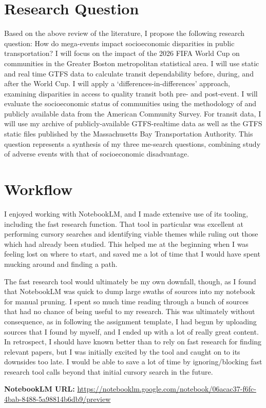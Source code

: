 \documentclass[12pt]{article}
\begin{document}
\section{Research Question}
Based on the above review of the literature, I propose the following research question:
How do mega-events impact socioeconomic disparities in public transportation?
I will focus on the impact of the 2026 FIFA World Cup on communities in the Greater Boston metropolitan statistical area.
I will use static and real time GTFS data to calculate transit dependability before, during, and after the World Cup.
I will apply a `differences-in-differences' approach, examining disparities in access to quality transit both pre- and post-event.
I will evaluate the socioeconomic status of communities using the methodology of \citet{allenSizingTransportPoverty2019} and publicly available data from the American Community Survey.
For transit data, I will use my archive of publicly-available GTFS-realtime data as well as the GTFS static files published by the Massachusetts Bay Transportation Authority.
This question represents a synthesis of my three me-search questions, combining study of adverse events with that of socioeconomic disadvantage.
\section{Workflow}
I enjoyed working with NotebookLM, and I made extensive use of its tooling, including the fast research function.
That tool in particular was excellent at performing cursory searches and identifying viable themes while ruling out those which had already been studied.
This helped me at the beginning when I was feeling lost on where to start, and saved me a lot of time that I would have spent mucking around and finding a path.

The fast research tool would ultimately be my own downfall, though, as I found that NotebookLM was quick to dump large swaths of sources into my notebook for manual pruning.
I spent so much time reading through a bunch of sources that had no chance of being useful to my research.
This was ultimately without consequence, as in following the assignment template, I had begun by uploading sources that I found by myself, and I ended up with a lot of really great content.
In retrospect, I should have known better than to rely on fast research for finding relevant papers, but I was initially excited by the tool and caught on to its downsides too late.
I would be able to save a lot of time by ignoring/blocking fast research tool calls beyond that initial cursory search in the future.

\textbf{NotebookLM URL:} \url{https://notebooklm.google.com/notebook/06acac37-f6fc-4bab-8488-5a98814b6db9/preview}

\printbibliography
\end{document}
